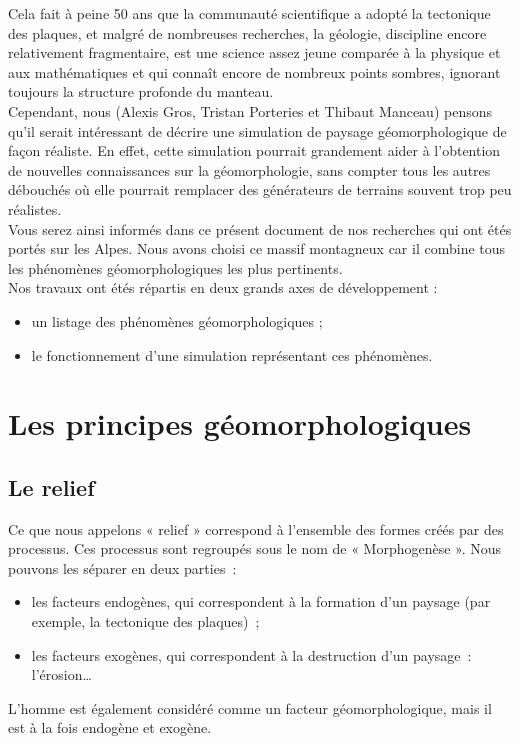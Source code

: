 \documentclass[a4paper,11pt]{article}
\begin{document}
Cela fait à peine 50 ans que la communauté scientifique a adopté la tectonique des plaques, et malgré de nombreuses recherches, la géologie, discipline encore relativement fragmentaire, est une science assez jeune comparée à la physique et aux mathématiques et qui connaît encore de nombreux points sombres, ignorant toujours la structure profonde du manteau. \\
Cependant, nous (Alexis Gros, Tristan Porteries et Thibaut Manceau) pensons qu'il serait intéressant de décrire une simulation de paysage géomorphologique de façon réaliste.
En effet, cette simulation pourrait grandement aider à l'obtention de nouvelles connaissances sur la géomorphologie, sans compter tous les autres débouchés où elle pourrait remplacer des générateurs de terrains souvent trop peu réalistes. \\
Vous serez ainsi informés dans ce présent document de nos recherches qui ont étés portés sur les Alpes. Nous avons choisi ce massif montagneux car il combine tous les phénomènes géomorphologiques les plus pertinents.\\
Nos travaux ont étés répartis en deux grands axes de développement :\\
\begin{itemize}
  \item un listage des phénomènes géomorphologiques ;
  \item le fonctionnement d'une simulation représentant ces phénomènes.
\end{itemize}

\section{Les principes géomorphologiques}

\subsection{Le relief}

Ce que nous appelons « relief » correspond à l'ensemble des formes créés par des processus.
Ces processus sont regroupés sous le nom de « Morphogenèse ».
Nous pouvons les séparer en deux parties~:
\begin{itemize}
  \item les facteurs endogènes, qui correspondent à la formation d'un paysage (par exemple, la tectonique des plaques)~;
  \item les facteurs exogènes, qui correspondent à la destruction d'un paysage~: l'érosion\ldots
\end{itemize}
L'homme est également considéré comme un facteur géomorphologique, mais il est à la fois endogène et exogène. \\
\end{document}
